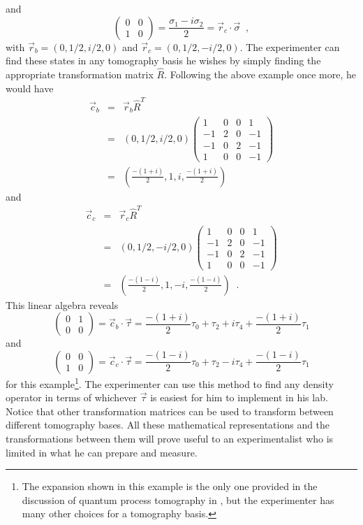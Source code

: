 and
$$
\begin{pmatrix}
0 & 0\\
1 & 0
\end{pmatrix} = \frac{\sigma_1-i\sigma_2}{2} = \vec{r}_c\cdot\vec{\sigma}\;\;,
$$
with $\vec{r}_b = (0,1/2,i/2,0)$ and $\vec{r}_c = (0,1/2,-i/2,0)$.  The experimenter can find these states in any tomography basis he wishes by simply finding the appropriate transformation matrix $\hat{R}$.  Following the above example once more, he would have
\begin{eqnarray*}
\vec{c}_b &=& \vec{r}_b\hat{R}^T \\
&=& (0,1/2,i/2,0)\begin{pmatrix}
1 & 0 & 0 & 1\\
-1 & 2 & 0 & -1\\
-1 & 0 & 2 & -1\\
1 & 0 & 0 & -1
\end{pmatrix}\\
&=& \left(\frac{-(1+i)}{2},1,i,\frac{-(1+i)}{2}\right)
\end{eqnarray*}
and
\begin{eqnarray*}
\vec{c}_c &=& \vec{r}_c\hat{R}^T \\
&=& (0,1/2,-i/2,0)\begin{pmatrix}
1 & 0 & 0 & 1\\
-1 & 2 & 0 & -1\\
-1 & 0 & 2 & -1\\
1 & 0 & 0 & -1
\end{pmatrix}\\
&=& \left(\frac{-(1-i)}{2},1,-i,\frac{-(1-i)}{2}\right)\;\;.
\end{eqnarray*}
This linear algebra reveals
$$
\begin{pmatrix}
0 & 1\\
0 & 0
\end{pmatrix} = \vec{c}_b\cdot\vec{\tau} = \frac{-(1+i)}{2}\tau_0+\tau_2+i\tau_4+\frac{-(1+i)}{2}\tau_1
$$
and
$$
\begin{pmatrix}
0 & 0\\
1 & 0
\end{pmatrix} = \vec{c}_c\cdot\vec{\tau} = \frac{-(1-i)}{2}\tau_0+\tau_2-i\tau_4+\frac{-(1-i)}{2}\tau_1
$$
for this example\footnote{The expansion shown in this example is the only one provided in the discussion of quantum process tomography in \cite{Nielsen2010}, but the experimenter has many other choices for a tomography basis.}.  The experimenter can use this method to find any density operator in terms of whichever $\vec{\tau}$ is easiest for him to implement in his lab.  Notice that other transformation matrices can be used to transform between different tomography bases.  All these mathematical representations and the transformations between them will prove useful to an experimentalist who is limited in what he can prepare and measure.

